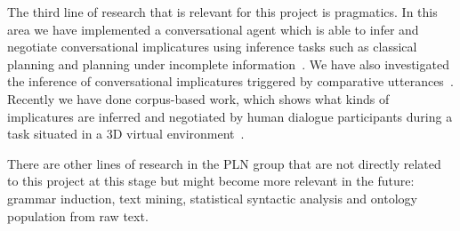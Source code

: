 The third line of research that is relevant for this project is pragmatics. In
this area we have implemented a conversational agent which is able to infer and
negotiate conversational implicatures using inference tasks such as
classical planning and planning under incomplete information~\cite{benotti09b}.
We have also investigated the inference of conversational implicatures triggered
by comparative utterances~\cite{benotti09a}. Recently we have done corpus-based
work, which shows what kinds of implicatures are inferred and negotiated by
human dialogue participants during a task situated in a 3D
virtual environment~\cite{benotti09c}. 

There are other lines of research in the PLN group that are not directly related
to this project at this stage but might become more relevant in the
future: grammar induction, text mining, statistical syntactic analysis
and ontology population from raw text. 





